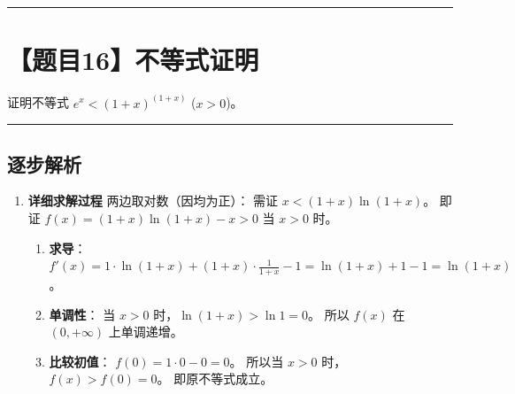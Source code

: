 \documentclass[UTF8]{ctexart}
\newenvironment{redenv}{\color{red}}{}
\newenvironment{detailedanalysis}{%
    \color{red}
    \begin{enumerate}[label=\textbf{第\arabic*步：}, leftmargin=*, align=left, itemsep=1.5ex]
}{%
    \end{enumerate}
}
\newcommand{\problemrule}{\noindent\rule{\textwidth}{1.5pt}\vspace{-0.8em}}
\newcommand{\analysisrule}{\noindent\rule{\textwidth}{0.8pt}\vspace{-0.8em}}
\begin{document}
\problemrule
\section*{【题目16】不等式证明}
证明不等式 $ e^{x} < (1 + x)^{(1 + x)} $ ($x > 0$)。

\begin{redenv}
\analysisrule
\subsection*{逐步解析}

\begin{detailedanalysis}
\item \textbf{详细求解过程}
两边取对数（因均为正）：
需证 $x < (1+x) \ln(1+x)$。
即证 $f(x) = (1+x) \ln(1+x) - x > 0$ 当 $x > 0$ 时。
\begin{enumerate}[label=(\arabic*)]
\item \textbf{求导}：
$f'(x) = 1 \cdot \ln(1+x) + (1+x) \cdot \frac{1}{1+x} - 1 = \ln(1+x) + 1 - 1 = \ln(1+x)$。
\item \textbf{单调性}：
当 $x > 0$ 时，$\ln(1+x) > \ln 1 = 0$。
所以 $f(x)$ 在 $(0, +\infty)$ 上单调递增。
\item \textbf{比较初值}：
$f(0) = 1 \cdot 0 - 0 = 0$。
所以当 $x > 0$ 时，$f(x) > f(0) = 0$。
即原不等式成立。
\end{enumerate}
\end{detailedanalysis}
\end{redenv}
\end{document}
